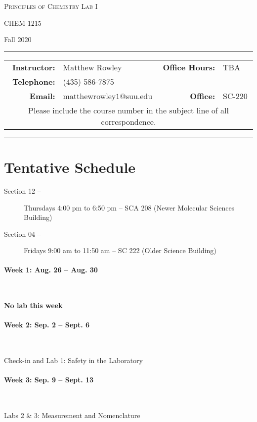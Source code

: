 \documentclass[12pt, letterpaper]{article}
\begin{document}
\begin{center}
{\Large \textsc{Principles of Chemistry Lab I}}

CHEM 1215
\end{center}
\begin{center}
	{\large Fall 2020}
\end{center}
\begin{center}
	\rule{0.97\textwidth}{0.4pt}
	\begin{tabular}{rlcrl}
		\textbf{Instructor:} & Matthew Rowley & & \textbf{Office Hours:} & TBA \\
		\textbf{Telephone:} & (435) 586-7875 & & & \\
		\textbf{Email:} & \multicolumn{2}{l}{matthewrowley$1$@suu.edu} & \textbf{Office:} & SC-220\\
		\multicolumn{5}{c}{Please include the course number in the subject line of all correspondence.} 
	\end{tabular}
	\rule{0.97\textwidth}{0.4pt}
\end{center}

\section*{Tentative Schedule}
\begin{description}
	\item[Section 12 --] Thursdays 4:00 pm to 6:50 pm -- SCA 208 (Newer Molecular Sciences Building)
	\item[Section 04 --] Fridays 9:00 am to 11:50 am -- SC 222 (Older Science Building)
\end{description}

\paragraph*{Week 1: Aug. 26 -- Aug. 30}~

\textbf{No lab this week}

\paragraph{Week 2: Sep. 2 -- Sept. 6}~

Check-in and Lab 1: Safety in the Laboratory

\paragraph{Week 3: Sep. 9 -- Sept. 13}~

Labs 2 \& 3: Measurement and Nomenclature
\end{document}

